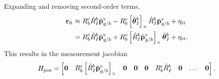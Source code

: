 Expanding and removing second-order terms,
\begin{align*}
  \boldsymbol{\mathrm{r}}_{\text{ft}} &\approx R_b^c \hat{R}_I^b \tilde{\boldsymbol{\mathrm{p}}}_{g/b}^v -
  R_b^c \left[ \tilde{\boldsymbol{\mathrm{\theta}}}_I^b  \right]_{\times} \hat{R}_I^b \hat{\boldsymbol{\mathrm{p}}}_{g/b}^v 
      + \eta_{\text{rt}} \\
&= R_b^c \hat{R}_I^b \tilde{\boldsymbol{\mathrm{p}}}_{g/b}^v + R_b^c \left[ \hat{R}_I^b \hat{\boldsymbol{\mathrm{p}}}_{g/b}^v \right]_{\times} \tilde{\boldsymbol{\mathrm{\theta}}}_I^b 
      + \eta_{\text{rt}}.
\end{align*}
This results in the measurement jacobian
\begin{equation*}
  H_{\text{pos}} =
  \begin{bmatrix}
    \boldsymbol{\mathrm{0}} & R_b^c \left[  \hat{R}_I^b \hat{\boldsymbol{\mathrm{p}}}_{g/b}^v  \right]_{\times} & \boldsymbol{\mathrm{0}} &
    \boldsymbol{\mathrm{0}} & \boldsymbol{\mathrm{0}} & R_b^c \hat{R}_I^b & \boldsymbol{\mathrm{0}} & \dots & \boldsymbol{\mathrm{0}}
  \end{bmatrix}.
\end{equation*}




